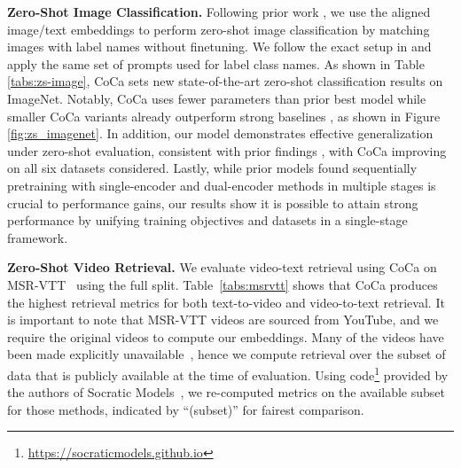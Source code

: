 \textbf{Zero-Shot Image Classification.}
Following prior work \cite{radford2021learning,jia2021scaling},
we use the aligned image/text embeddings to perform zero-shot image classification by matching images with label names without finetuning.
We follow the exact setup in \cite{radford2021learning} and apply the same set of prompts used for label class names.
As shown in Table \ref{tabs:zs-image},
CoCa sets new state-of-the-art zero-shot classification results on ImageNet.
Notably, CoCa uses fewer parameters than prior best model \cite{pham2021combined} while smaller CoCa variants already outperform strong baselines \cite{radford2021learning,yuan2021florence}, as shown in Figure \ref{fig:zs_imagenet}.
In addition,
our model demonstrates effective generalization under zero-shot evaluation,
consistent with prior findings \cite{radford2021learning,jia2021scaling},
with CoCa improving on all six datasets considered.
Lastly,
while prior models \cite{zhai2021lit,pham2021combined} found sequentially pretraining with single-encoder and dual-encoder methods in multiple stages 
is crucial to performance gains,
our results show it is possible to attain strong performance by unifying training objectives and datasets in a single-stage framework.


\textbf{Zero-Shot Video Retrieval.} 
We evaluate video-text retrieval using CoCa on MSR-VTT~\cite{xu2016msr} using the full split. 
Table~\ref{tabs:msrvtt} shows that CoCa produces the highest retrieval metrics for both text-to-video and video-to-text retrieval. 
It is important to note that MSR-VTT videos are sourced from YouTube, and we require the original videos to compute our embeddings. 
Many of the videos have been made explicitly unavailable~\cite{smaira2020short},
hence we compute retrieval over the subset of data that is publicly available at the time of evaluation.  
Using code\footnote{\url{https://socraticmodels.github.io}} provided by the authors of Socratic Models~\cite{zeng2022socratic},
we re-computed metrics on the available subset for those methods, indicated by ``(subset)'' for fairest comparison.




